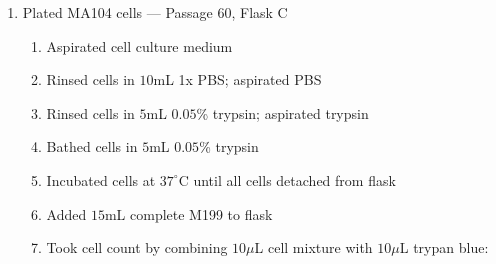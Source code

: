 \begin{enumerate}
	\item Plated MA104 cells --- Passage 60, Flask C
		\begin{enumerate}
			\item Aspirated cell culture medium
			\item Rinsed cells in $10$mL 1x PBS; aspirated PBS
			\item Rinsed cells in $5$mL $0.05$\% trypsin; aspirated trypsin
			\item Bathed cells in $5$mL $0.05$\% trypsin
			\item Incubated cells at $37^{\circ}$C until all cells detached from flask
			\item Added $15$mL complete M199 to flask
			\item Took cell count by combining $10\mu$L cell mixture with $10\mu$L trypan blue:
			

\end{enumerate}
\end{enumerate}
